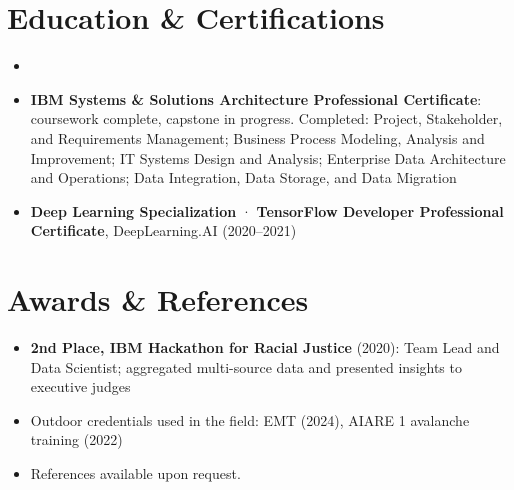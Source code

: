 \documentclass[11pt,a4paper,sans]{moderncv}
\begin{document}
\section{Education \& Certifications}
\vspace{1pt}
\begin{itemize}

\item{}

\vspace{3pt}

\item \textbf{IBM Systems \& Solutions Architecture Professional Certificate}: coursework complete, capstone in progress. Completed: Project, Stakeholder, and Requirements Management; Business Process Modeling, Analysis and Improvement; IT Systems Design and Analysis; Enterprise Data Architecture and Operations; Data Integration, Data Storage, and Data Migration

\item \textbf{Deep Learning Specialization} · \textbf{TensorFlow Developer Professional Certificate}, DeepLearning.AI (2020--2021)

\end{itemize}


\section{Awards \& References}
\vspace{1pt}
\begin{itemize}
\item \textbf{2nd Place, IBM Hackathon for Racial Justice} (2020): Team Lead and Data Scientist; aggregated multi-source data and presented insights to executive judges
\item Outdoor credentials used in the field: EMT (2024), AIARE 1 avalanche training (2022)
\item References available upon request.
\end{itemize}
\end{document}
